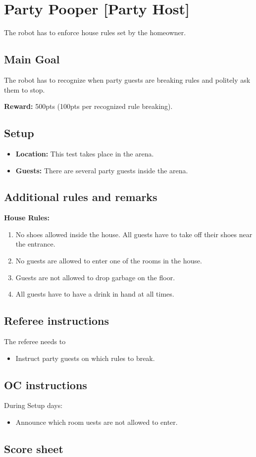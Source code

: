 \section{Party Pooper [Party Host]}
The robot has to enforce house rules set by the homeowner.


\subsection{Main Goal}
The robot has to recognize when party guests are breaking rules and politely ask them to stop.

\noindent\textbf{Reward:} 500pts (100pts per recognized rule breaking).

\subsection{Setup}
\begin{itemize}[nosep]
	\item \textbf{Location:} This test takes place in the arena.
	\item \textbf{Guests:} There are several party guests inside the arena.
\end{itemize}


\subsection{Additional rules and remarks}
\textbf{House Rules:}
\begin{enumerate}[nosep]
	\item No shoes allowed inside the house. All guests have to take off their shoes near the entrance.
	\item No guests are allowed to enter one of the rooms in the house.
	\item Guests are not allowed to drop garbage on the floor.
	\item All guests have to have a drink in hand at all times.
\end{enumerate}

\subsection{Referee instructions}

The referee needs to
\begin{itemize}
	\item Instruct party guests on which rules to break.
\end{itemize}

\subsection{OC instructions}
During Setup days:
\begin{itemize}
	\item Announce which room uests are not allowed to enter.
\end{itemize}

\newpage
\subsection{Score sheet}



